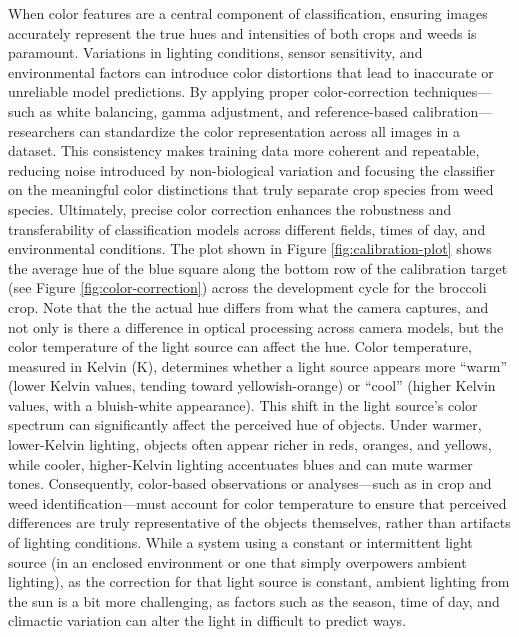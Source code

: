 \documentclass[letterpaper, notitlepage]{report}
\begin{document}
When color features are a central component of classification, ensuring images accurately represent the true hues and intensities of both crops and weeds is paramount. Variations in lighting conditions, sensor sensitivity, and environmental factors can introduce color distortions that lead to inaccurate or unreliable model predictions. By applying proper color-correction techniques—such as white balancing, gamma adjustment, and reference-based calibration—researchers can standardize the color representation across all images in a dataset. This consistency makes training data more coherent and repeatable, reducing noise introduced by non-biological variation and focusing the classifier on the meaningful color distinctions that truly separate crop species from weed species. Ultimately, precise color correction enhances the robustness and transferability of classification models across different fields, times of day, and environmental conditions. The plot shown in Figure \ref{fig:calibration-plot} shows the average hue of the blue square along the bottom row of the calibration target (see Figure \ref{fig:color-correction}) across the development cycle for the broccoli crop. Note that the the actual hue differs from what the camera captures, and not only is there a difference in optical processing across camera models, but the color temperature of the light source can affect the hue. Color temperature, measured in Kelvin (K), determines whether a light source appears more “warm” (lower Kelvin values, tending toward yellowish-orange) or “cool” (higher Kelvin values, with a bluish-white appearance). This shift in the light source’s color spectrum can significantly affect the perceived hue of objects. Under warmer, lower-Kelvin lighting, objects often appear richer in reds, oranges, and yellows, while cooler, higher-Kelvin lighting accentuates blues and can mute warmer tones. Consequently, color-based observations or analyses—such as in crop and weed identification—must account for color temperature to ensure that perceived differences are truly representative of the objects themselves, rather than artifacts of lighting conditions. While a system using a constant or intermittent light source (in an enclosed environment or one that simply overpowers ambient lighting), as the correction for that light source is constant, ambient lighting from the sun is a bit more challenging, as factors such as the season, time of day, and climactic variation can alter the light in difficult to predict ways.
\end{document}
